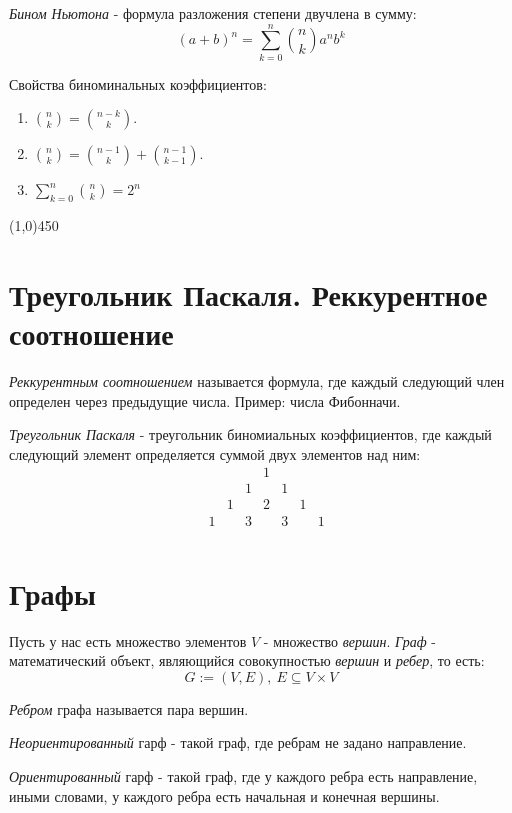 \documentclass[a4paper,12pt]{article}
\begin{document}
	\textit{Бином Ньютона} - формула разложения степени двучлена в сумму:
	\[
	(a + b)^n = \sum_{k = 0}^{n} {n \choose k} a^nb^k
	\]
	
	Свойства биноминальных коэффициентов:
	\begin{enumerate}
		\item ${n \choose k} = {n - k \choose k}$.
		\item ${n \choose k} = {n - 1 \choose k} + {n -1 \choose k - 1}.$
		\item $\sum_{k = 0}^n {n \choose k} = 2 ^ n$
	\end{enumerate}
	
	
	\begin{center}
		\line(1,0){450}
	\end{center}
	
	\section*{Треугольник Паскаля. Реккурентное соотношение}
	\textit{Реккурентным соотношением} называется формула, где каждый следующий член определен через предыдущие числа. Пример: числа Фибонначи. 
	
	\textit{Треугольник Паскаля} - треугольник биномиальных коэффициентов, где каждый следующий элемент определяется суммой двух элементов над ним:
	\[
	\begin{matrix}
			&	&	&	&1	&	&	&	\\
			&	&	&1	&	& 1 & 	&	\\
			&	&1	&	&2	&	&1 	& 	\\	
			&1	&	&3	&	&3	& 	&1 	\\	
			
	\end{matrix}	
	\]
	
	\section*{Графы}
	Пусть у нас есть множество элементов $V$ - множество \textit{вершин}. 
	\textit{Граф} - математический объект, являющийся совокупностью \textit{вершин} и \textit{ребер}, то есть:
	\[
	G := (V, E), \ E \subseteq V \times V
	\]
	
	\textit{Ребром} графа называется пара вершин.
	
	\textit{Неориентированный} гарф - такой граф, где ребрам не задано направление.
	
	\textit{Ориентированный} гарф - такой граф, где у каждого ребра есть направление, иными словами, у каждого ребра есть начальная и конечная вершины.
	
\end{document}
